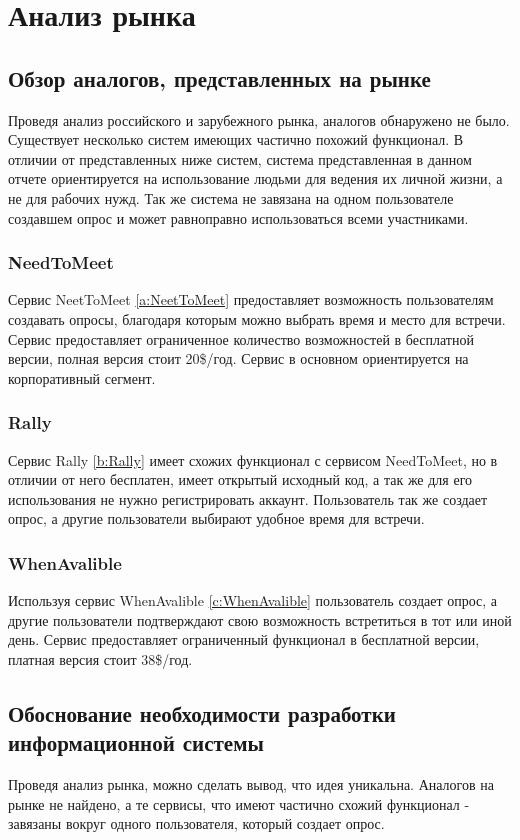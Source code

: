 \documentclass[14pt]{extreport}
\begin{document}
    \section{Анализ рынка \label{chapter2}}
        \subsection{Обзор аналогов, представленных на рынке}
        Проведя анализ российского и зарубежного рынка, аналогов обнаружено не было. Существует несколько систем имеющих частично похожий функционал. 
        В отличии от представленных ниже систем, система представленная в данном отчете ориентируется на использование людьми для ведения их личной жизни, а не для рабочих нужд. Так же система не завязана на одном пользователе создавшем опрос и может равноправно использоваться всеми участниками.
        \subsubsection{NeedToMeet}
        Сервис NeetToMeet \eqref{a:NeetToMeet} предоставляет возможность пользователям создавать опросы, благодаря которым можно выбрать время и место для встречи. Сервис предоставляет ограниченное количество возможностей в бесплатной версии, полная версия стоит 20\$/год. Сервис в основном ориентируется на корпоративный сегмент. 
        \subsubsection{Rally}
        Сервис Rally \eqref{b:Rally} имеет схожих функционал с сервисом NeedToMeet, но в отличии от него бесплатен, имеет открытый исходный код, а так же для его использования не нужно регистрировать аккаунт. Пользователь так же создает опрос, а другие пользователи выбирают удобное время для встречи. 
        \subsubsection{WhenAvalible}
        Используя сервис WhenAvalible \eqref{c:WhenAvalible} пользователь создает опрос, а другие пользователи подтверждают свою возможность встретиться в тот или иной день. Сервис предоставляет ограниченный функционал в бесплатной версии, платная версия стоит 38\$/год.

        \subsection{Обоснование необходимости разработки информационной системы }
        Проведя анализ рынка, можно сделать вывод, что идея уникальна. Аналогов на рынке не найдено, а те сервисы, что имеют частично схожий функционал - завязаны вокруг одного пользователя, который создает опрос. 
\end{document}
